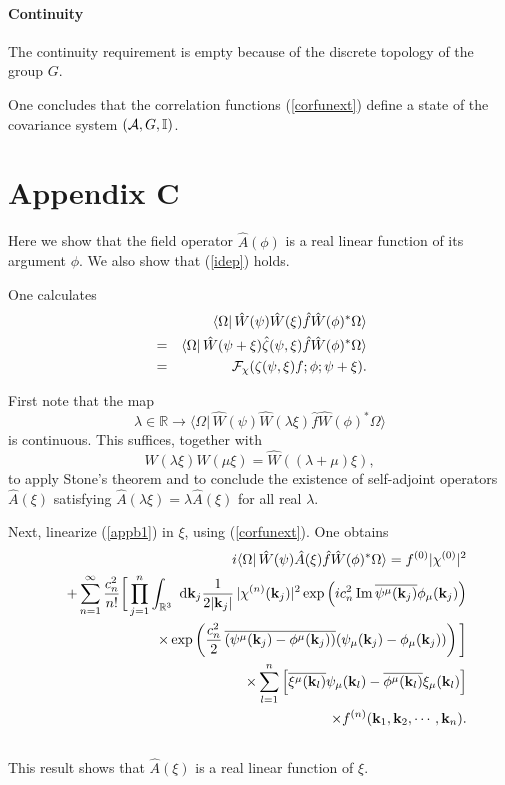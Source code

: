 \documentclass[12pt,a4paper]{article}
\def\Ro{{\mathbb R}}
\def\Io{{\mathbb I}}
\def\kk{{\bf k}}
\renewcommand{\Im}{\,{\rm Im}\,}
\begin{document}
\paragraph{Continuity}
The continuity requirement is empty because of the discrete topology
of the group $G$.

One concludes that the correlation functions (\ref{corfunext})
define a state of the covariance system $({\cal A},G,\Io)$.

\section*{Appendix C}

Here we show that the field operator $\hat A(\phi)$ is a real linear function
of its argument $\phi$. We also show that (\ref{idep}) holds.

One calculates
\begin{eqnarray}
& &\langle\Omega|\,\hat W(\psi)\hat W(\xi)\hat f\hat W(\phi)^*\Omega\rangle\cr
&=&\langle\Omega|\,\hat W(\psi+\xi)\hat\zeta(\psi,\xi)\hat f\hat W(\phi)^*\Omega\rangle\cr
&=&{\cal F}_\chi(\zeta(\psi,\xi)f;\phi;\psi+\xi).
\label{appb1}
\end{eqnarray}

First note that the map
\begin{equation}
\lambda\in\Ro\rightarrow
\langle\Omega|\,\hat W(\psi)\hat W(\lambda\xi)\hat f\hat W(\phi)^*\Omega\rangle
\end{equation}
is continuous. This suffices, together with
\begin{equation}
\hat W(\lambda\xi)\hat W(\mu\xi)=\hat W((\lambda+\mu)\xi),
\end{equation}
to apply Stone's theorem and to conclude the existence of self-adjoint operators
$\hat A(\xi)$ satisfying $\hat A(\lambda\xi)=\lambda\hat A(\xi)$
for all real $\lambda$.

Next, linearize (\ref{appb1}) in $\xi$, using (\ref{corfunext}). One obtains
\begin{eqnarray}
& &i\langle\Omega|\,\hat W(\psi)\hat A(\xi)\hat f\hat W(\phi)^*\Omega\rangle
=f^{(0)}|\chi^{(0)}|^2\cr
& &
+\sum_{n=1}^\infty\frac{c_n^2}{n!}\bigg[\prod_{j=1}^n\int_{\Ro^3}\hbox{ d}\kk_j
\frac{1}{2|\kk_j|}\,|\chi^{(n)}(\kk_j)|^2
\exp\left(ic_n^2\Im\overline{ \psi^\mu(\kk_j)}\phi_\mu(\kk_j)
\right)\cr
& &\times\exp\left(
\frac{c_n^2}{2}\,\overline{( \psi^\mu(\kk_j)-\phi^\mu(\kk_j))}
(\psi_\mu(\kk_j)-\phi_\mu(\kk_j))
\right)\bigg]\cr
& &\times\sum_{l=1}^n\left[\overline{\xi^\mu(\kk_l)}\psi_\mu(\kk_l)
-\overline{\phi^\mu(\kk_l)}\xi_\mu(\kk_l)\right]
\cr
& &\times f^{(n)}(\kk_1,\kk_2,\cdots,\kk_n).\cr
& &
\label{appb2}
\end{eqnarray}
This result shows that $\hat A(\xi)$ is a real linear function of $\xi$.
\end{document}
